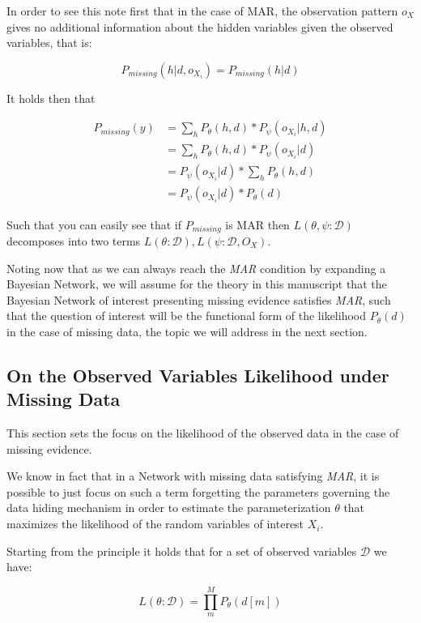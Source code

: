 \documentclass[11pt]{article}
\begin{document}
\begin{article}
In order to see this note first that in the case of MAR, the
observation pattern \(o_X\) gives no additional information about the
hidden variables given the observed variables, that is:

$$ P_{missing} (h | d, o_{X_i}) =  P_{missing} (h | d) $$

It holds then that 


\begin{align}
P_{missing}(y) &= \sum_h P_{\theta} (h, d) * P_\psi(o_{X_i} | h, d) \nonumber \\
             &= \sum_h P_{\theta} (h, d) * P_\psi(o_{X_i} | d) \nonumber \\
             &= P_\psi(o_{X_i} | d) * \sum_h P_{\theta} (h, d)  \nonumber \\
	     &= P_\psi(o_{X_i} | d) * P_{\theta} (d)  \nonumber		
\end{align}

Such that you can easily see that if \(P_{missing}\) is MAR then
\(L(\theta, \psi : \mathscr{D})\) decomposes into two terms \(L(\theta :
   \mathscr{D}), L(\psi : \mathscr{D}, O_X)\).

Noting now that as we can always reach the \emph{MAR} condition by
expanding a Bayesian Network, we will assume for the theory in this
manuscript that the Bayesian Network of interest presenting missing
evidence satisfies \emph{MAR}, such that the question of interest will
be the functional form of the likelihood \(P_{\theta} (d)\) in the
case of missing data, the topic we will address in the next
section.

\subsection{On the Observed Variables Likelihood under Missing Data}
\label{sec:org5c32676}

This section sets the focus on the likelihood of the observed data
in the case of missing evidence.

We know in fact that in a Network with missing data satisfying
\emph{MAR}, it is possible to just focus on such a term forgetting the
parameters governing the data hiding mechanism in order to estimate
the parameterization \(\theta\) that maximizes the likelihood of the
random variables of interest \(X_i\).

Starting from the principle it holds that for a set of observed
variables \(\mathscr{D}\) we have:

$$ L(\theta: \mathscr{D}) = \prod_m^M P_\theta(d[m]) $$


\end{article}
\end{document}

